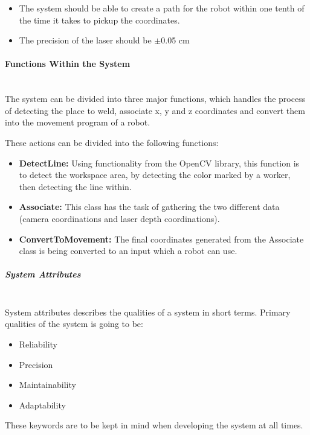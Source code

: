 \begin{itemize}

\item The system should be able to create a path for the robot within one tenth of the time it takes to pickup the coordinates.
\item The precision of the laser should be $\pm$0.05 cm

\end{itemize}

\paragraph*{Functions Within the System}~\\

The system can be divided into three major functions, which handles the process of detecting the place to weld, associate x, y and z coordinates and convert them into the movement program of a robot.

These actions can be divided into the following functions:

\begin{itemize}

\item \textbf{DetectLine:} Using functionality from the OpenCV library, this function is to detect the workspace area, by detecting the color marked by a worker, then detecting the line within.
\item \textbf{Associate:} This class has the task of gathering the two different data (camera coordinations and laser depth coordinations).
\item \textbf{ConvertToMovement:} The final coordinates generated from the Associate class is being converted to an input which a robot can use. 

\end{itemize}

\subparagraph*{System Attributes}~\\
System attributes describes the qualities of a system in short terms. Primary qualities of the system is going to be:

\begin{itemize}
\item Reliability
\item Precision
\item Maintainability
\item Adaptability 
\end{itemize}
These keywords are to be kept in mind when developing the system at all times.

